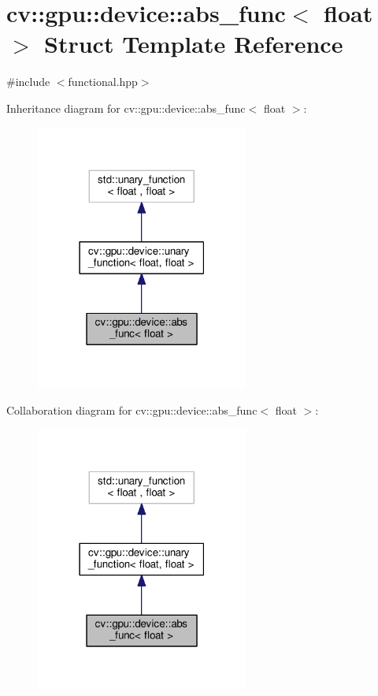 \hypertarget{structcv_1_1gpu_1_1device_1_1abs__func_3_01float_01_4}{\section{cv\-:\-:gpu\-:\-:device\-:\-:abs\-\_\-func$<$ float $>$ Struct Template Reference}
\label{structcv_1_1gpu_1_1device_1_1abs__func_3_01float_01_4}
}


{\ttfamily \#include $<$functional.\-hpp$>$}



Inheritance diagram for cv\-:\-:gpu\-:\-:device\-:\-:abs\-\_\-func$<$ float $>$\-:\nopagebreak
\begin{figure}[H]
\begin{center}
\leavevmode
\includegraphics[width=198pt]{structcv_1_1gpu_1_1device_1_1abs__func_3_01float_01_4__inherit__graph}
\end{center}
\end{figure}


Collaboration diagram for cv\-:\-:gpu\-:\-:device\-:\-:abs\-\_\-func$<$ float $>$\-:\nopagebreak
\begin{figure}[H]
\begin{center}
\leavevmode
\includegraphics[width=198pt]{structcv_1_1gpu_1_1device_1_1abs__func_3_01float_01_4__coll__graph}
\end{center}
\end{figure}
